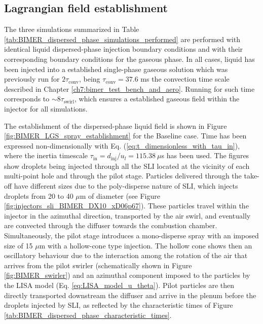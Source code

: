 \subsection{Lagrangian field establishment}

The three simulations summarized in Table \ref{tab:BIMER_dispersed_phase_simulations_performed} are performed with identical liquid dispersed-phase injection boundary conditions and with their corresponding boundary conditions for the gaseous phase. In all cases, liquid has been injected into a established single-phase gaseous solution which was previously run for $2 \tau_\mathrm{conv}$, being $\tau_\mathrm{conv} = 37.6$ ms the convection time scale described in Chapter \ref{ch7:bimer_test_bench_and_aero}. Running for such time corresponds to $\sim 8 \tau_\mathrm{swirl}$, which ensures a established gaseous field within the injector for all simulations.

The establishment of the dispersed-phase liquid field is shown in Figure \ref{fig:BIMER_LGS_spray_establishment} for the Baseline case. Time has been expressed non-dimensionally with Eq. (\ref{eq:t_dimensionless_with_tau_in}), where the inertia timescale $\tau_\mathrm{in} = d_\mathrm{inj}/u_l = 115.38~\mu$s has been used. The figures show droplets being injected through all the SLI located at the vicinity of each multi-point hole and through the pilot stage. Particles delivered through the take-off have different sizes due to the poly-disperse nature of SLI, which injects droplets from 20 to 40 $\mu$m of diameter (see Figure \ref{fig:injectors_sli_BIMER_DX10_xD06p67}). These particles travel within the injector in the azimuthal direction, transported by the air swirl, and eventually are convected through the diffuser towards the combustion chamber. Simultaneously, the pilot stage introduces a mono-disperse spray with an imposed size of 15 $\mu$m with a hollow-cone type injection. The hollow cone shows then an oscillatory behaviour due to the interaction among the rotation of the air that arrives from the pilot swirler (schematically shown in Figure \ref{fig:BIMER_swirler}) and an azimuthal component imposed to the particles by the LISA model (Eq. \ref{eq:LISA_model_u_theta}). Pilot particles are then directly transported downstream the diffuser and arrive in the plenum before the droplets injected by SLI, as reflected by the characteristic times of Figure \ref{tab:BIMER_dispersed_phase_characteristic_times}.

